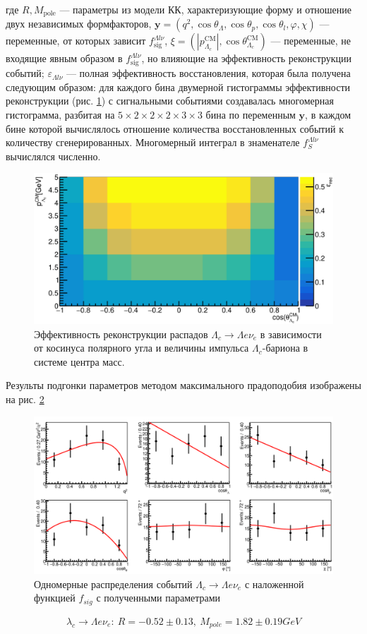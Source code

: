 где $ R, M_{\text{pole}} $ --- параметры из модели $КК$, характеризующие форму 
и отношение двух независимых формфакторов, 
$\mathbf{y} = (q^2, \cos\theta_\Lambda, \cos\theta_p, \cos\theta_l, \varphi, \chi)$ 
--- переменные, от которых зависит $ f_{\text{sig}}^{\Lambda l \nu} $, 
$ \xi = (|p_{\Lambda_c}^{\text{CM}}|, \cos\theta_{\Lambda_c}^{\text{CM}}) $ --- 
переменные, не входящие явным образом в $ f_{\text{sig}}^{\Lambda l \nu} $, 
но влияющие на эффективность реконструкции событий; 
$\varepsilon_{\Lambda l \nu} $ --- полная эффективность восстановления, 
которая была получена следующим образом: для каждого бина двумерной гистограммы 
эффективности реконструкции (рис. \ref{l_l_nu:rec}) с сигнальными событиями 
создавалась многомерная гистограмма, разбитая на 
$ 5 \times 2 \times 2 \times 2 \times 3 \times 3 $ бина по переменным 
$ \mathbf{y} $, в каждом бине которой вычислялось отношение количества восстановленных событий к количеству 
сгенерированных. Многомерный интеграл в знаменателе $ f_S^{\Lambda l \nu} $ вычислялся численно.

\begin{figure}[H]
    \centering
    \includegraphics[width=1\linewidth]{img/l_l_nu_rec.png}
    \caption{Эффективность реконструкции распадов $\Lambda_c \to \Lambda e \nu_e$ в зависимости от
    косинуса полярного угла и величины импульса $\Lambda_c$-бариона в системе центра масс.}
    \label{l_l_nu:rec}
\end{figure}


Результы подгонки параметров методом максимального прадоподобия изображены на рис. \ref{l_l_nu:fit}


\begin{figure}[H]
    \centering
    \includegraphics[width=1\linewidth]{img/l_l_nu_fit.png}
    \caption{Одномерные распределения событий $\Lambda_c \to \Lambda e \nu_e$ с наложенной
    функцией $f_{sig}$ с полученными параметрами}
    \label{l_l_nu:fit}
\end{figure}

\begin{eqnarray}
    \lambda_c \to \Lambda e \nu_e: \ R = -0.52 \pm 0.13,\ M_{pole} = 1.82 ± 0.19 GeV
\end{eqnarray}



